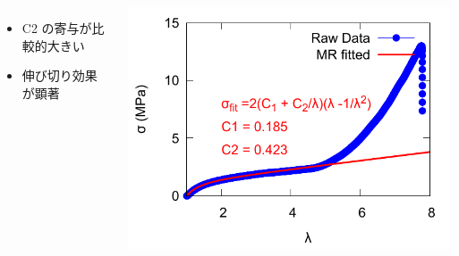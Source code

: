 \documentclass[unicode,12pt]{beamer}%
\begin{document}
\begin{frame}
\begin{columns}[T, totalwidth=\linewidth]
{\begin{itemize}
        \item
        C2 の寄与が比較的大きい
        \item
        伸び切り効果が顕著
        \end{itemize}
        }
        \includegraphics[width=\columnwidth]{SS_wMR_5_2.pdf}
    \end{columns}
\end{frame}



\end{document}
